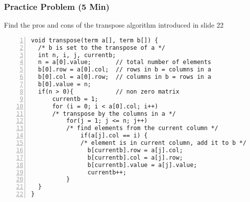 \documentclass[newPxFont,sthlmFooter,nooffset]{beamer}
\begin{document}
\begin{frame}[t,fragile]
	\frametitle{Practice Problem (5 Min)}
Find the pros and cons of the transpose algorithm introduced in slide 22

\begin{lstlisting}[frame=single, lineskip = -1pt, numbers = left,  numberstyle={\scriptsize}, framexleftmargin=15pt, framexrightmargin=-5pt, xleftmargin = 25pt ]
void transpose(term a[], term b[]) {
  /* b is set to the transpose of a */
  int n, i, j, currentb;
  n = a[0].value;       // total number of elements
  b[0].row = a[0].col;  // rows in b = columns in a
  b[0].col = a[0].row;  // columns in b = rows in a
  b[0].value = n;
  if(n > 0){            // non zero matrix
      currentb = 1;
      for (i = 0; i < a[0].col; i++)
      /* transpose by the columns in a */
          for(j = 1; j <= n; j++)
          /* find elements from the current column */
              if(a[j].col == i) {
              /* element is in current column, add it to b */
                b[currentb].row = a[j].col;  
                b[currentb].col = a[j].row;  
                b[currentb].value = a[j].value;  
                currentb++;
          }
  }
}
\end{lstlisting}   
	

\end{frame}
\end{document}
